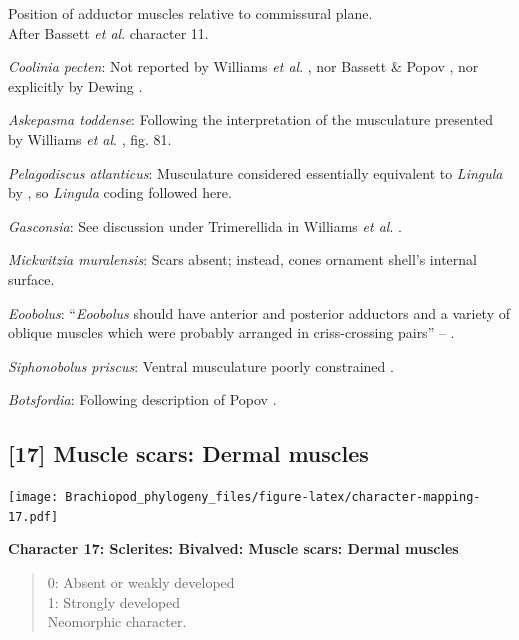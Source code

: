 \documentclass[]{book}
\theoremstyle{definition}
\theoremstyle{definition}
\theoremstyle{definition}
\theoremstyle{remark}
\begin{document}
Position of adductor muscles relative to commissural plane.\\
After Bassett \emph{et al}.
\citeyearpar{Bassett2001Functionalmorphology} character 11.

\emph{Coolinia pecten}: Not reported by Williams \emph{et al}.
\citeyearpar{Williams2000BrachiopodaLinguliformea}, nor Bassett \& Popov
\citeyearpar{Bassett2017Earliestontogeny}, nor explicitly by Dewing
\citeyearpar{Dewing2001Hingemodifications}.

\emph{Askepasma toddense}: Following the interpretation of the
musculature presented by Williams \emph{et al}.
\citeyearpar{Williams2000BrachiopodaLinguliformea}, fig. 81.

\emph{Pelagodiscus atlanticus}: Musculature considered essentially
equivalent to \emph{Lingula} by
\citet{Williams2000BrachiopodaLinguliformea}, so \emph{Lingula} coding
followed here.

\emph{Gasconsia}: See discussion under Trimerellida in Williams \emph{et
al}. \citeyearpar{Williams2000BrachiopodaLinguliformea}.

\emph{Mickwitzia muralensis}: Scars absent; instead, cones ornament
shell's internal surface.

\emph{Eoobolus}: ``\emph{Eoobolus} should have anterior and posterior
adductors and a variety of oblique muscles which were probably arranged
in criss-crossing pairs'' -- \citet{Balthasar2009Thebrachiopod}.

\emph{Siphonobolus priscus}: Ventral musculature poorly constrained
\citep{Williams2000BrachiopodaLinguliformea, Popov2009Earlyontogeny}.

\emph{Botsfordia}: Following description of Popov
\citeyearpar{Popov1992TheCambrian}.

\hypertarget{muscle-scars-dermal-muscles}{%
\subsection*{{[}17{]} Muscle scars: Dermal
muscles}\label{muscle-scars-dermal-muscles}}

\texttt{[image: Brachiopod\_phylogeny\_files/figure-latex/character-mapping-17.pdf]}

\textbf{Character 17: Sclerites: Bivalved: Muscle scars: Dermal muscles}

\begin{quote}
0: Absent or weakly developed\\
1: Strongly developed\\
Neomorphic character.
\end{quote}
\end{document}
